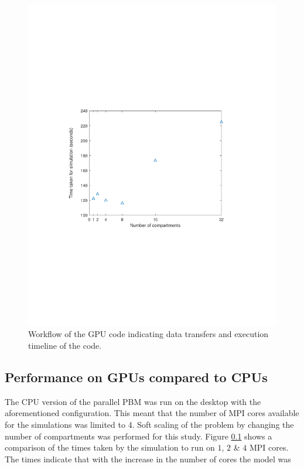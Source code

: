 \documentclass[preprint,10pt,authoryear]{elsarticle}
\begin{document}
\begin{linenumbers}
\begin{figure}[h]
\centering
\includegraphics[scale=0.7,trim=110 220 120 220, clip]{desktopgputiming.pdf}
\caption{Workflow of the GPU code indicating data transfers and execution timeline of the code.}
\label{fig:res_gpu_timings}
\end{figure}

\subsection{Performance on GPUs compared to CPUs}
The CPU version of the parallel PBM was run on the desktop with the aforementioned 
configuration. This meant that the number of MPI cores available for the simulations 
was limited to 4. Soft scaling of the problem by changing the number of compartments 
was performed for this study. Figure \ref{} shows a comparison of the times taken 
by the simulation to run on $1$, $2$ \& $4$ MPI cores. The times indicate that 
with the increase in the number of cores the model was


\end{linenumbers}
\end{document}

